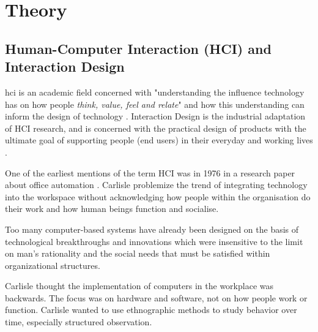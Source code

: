     

\chapter{Theory}

\section{Human-Computer Interaction (HCI) and Interaction Design}
\acrshort{hci} is an academic field concerned with "understanding the influence technology has on how people \textit{think, value, feel and relate}" and how this understanding can inform the design of technology \parencite{wright_empathy_2008}. Interaction Design is the industrial adaptation of HCI research, and is concerned with the practical design of products with the ultimate goal of supporting people (end users) in their everyday and working lives \parencite{rogers_interaction_2011}.


One of the earliest mentions of the term HCI was in 1976 in a research paper about office automation \parencite{Carlisle1976}. Carlisle problemize the trend of integrating technology into the workspace without acknowledging how people within the organisation do their work and how human beings function and socialise. 
\begin{displayquote}
    Too many computer-based systems have already been designed on the basis of technological breakthroughs and innovations which were insensitive to the limit on man's rationality and the social needs that must be satisfied within organizational structures.
\end{displayquote}

Carlisle thought the implementation of computers in the workplace was backwards. The focus was on hardware and software, not on how people work or function. Carlisle wanted to use ethnographic methods to study behavior over time, especially structured observation.

